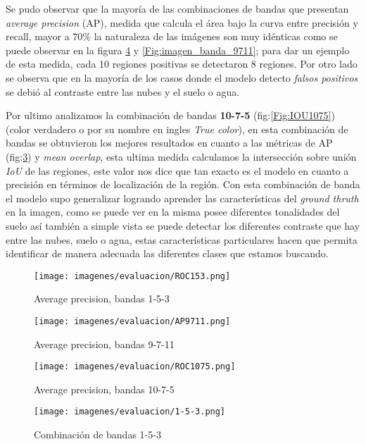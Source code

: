 Se pudo observar que la mayoría de las combinaciones de bandas que presentan \textit{average precision} (AP), medida que calcula  el área bajo la curva entre precisión y recall, mayor a $70\%$ la naturaleza de las imágenes son muy idénticas como se puede observar en la figura \ref{Fig:imagen_banda_153} y \ref{Fig:imagen_banda_9711}; para dar un ejemplo de esta medida, cada 10 regiones positivas se detectaron $8$ regiones. Por otro lado se observa que en la mayoría de los casos donde el modelo detecto \textit{falsos positivos} se debió al contraste entre las nubes y el suelo o agua.

Por ultimo analizamos la combinación de bandas \textbf{10-7-5} (fig:\ref{Fig:IOU1075}) (color verdadero o por su nombre en ingles \textit{True color}), en esta combinación de bandas se obtuvieron los mejores resultados en cuanto a las métricas de AP (fig:\ref{Fig:AP1075}) y  \textit{mean overlap}, esta ultima medida calculamos la intersección sobre unión \textit{IoU} de las regiones, este valor nos dice que tan exacto es el modelo en cuanto a precisión en términos de localización de la región. Con esta combinación de banda el modelo supo generalizar logrando aprender las características del \textit{ground thruth} en la imagen, como se puede ver en la misma posee diferentes tonalidades del suelo así también a simple vista se puede detectar los diferentes contraste que hay entre las nubes, suelo o agua, estas características particulares hacen que permita identificar de manera adecuada las diferentes clases que estamos buscando.

\begin{figure}[H]\centering
  \texttt{[image: imagenes/evaluacion/ROC153.png]}
  \caption{Average precision, bandas 1-5-3} \label{Fig:ROC153}
\end{figure}
\begin{figure}[H]\centering
  \texttt{[image: imagenes/evaluacion/AP9711.png]}
 \caption{Average precision, bandas 9-7-11} \label{Fig:AP9711}
\end{figure}
 \begin{figure}[H]\centering
  \texttt{[image: imagenes/evaluacion/ROC1075.png]}
  \caption{Average precision, bandas 10-7-5} \label{Fig:AP1075}
\end{figure}

 \begin{figure}[H]
 \centering
  \texttt{[image: imagenes/evaluacion/1-5-3.png]}
  \caption{Combinación de bandas 1-5-3} \label{Fig:imagen_banda_153}
\end{figure}
 
